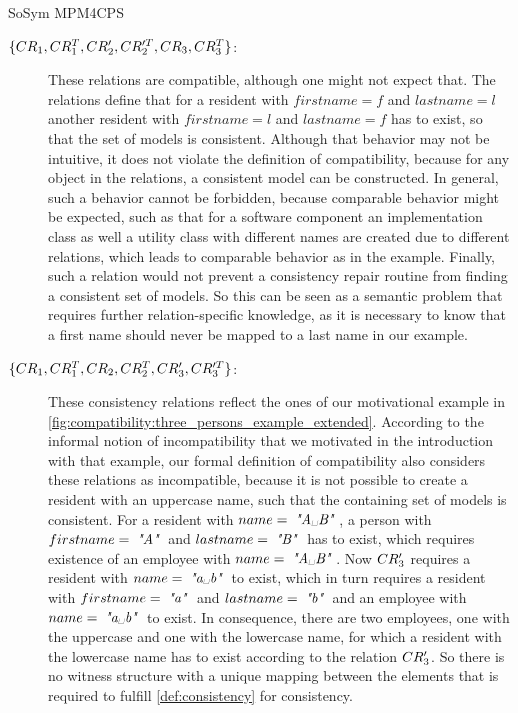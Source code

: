 \begin{copiedFrom}{SoSym MPM4CPS}
\begin{example}
\begin{description}
\item[$\{ CR_{1}, CR^T_{1}, CR'_{2}, CR'^T_{2}, CR_{3}, CR^T_{3} \}$:]
These relations are compatible, although one might not expect that. The relations define that for a resident with $firstname = f$ and $lastname = l$ another resident with $firstname = l$ and $lastname = f$ has to exist, so that the set of models is consistent.
Although that behavior may not be intuitive, it does not violate the definition of compatibility, because for any object in the relations, a consistent model can be constructed.
In general, such a behavior cannot be forbidden, because comparable behavior might be expected, such as that for a software component an implementation class as well a utility class with different names are created due to different relations, which leads to comparable behavior as in the example.
Finally, such a relation would not prevent a consistency repair routine from finding a consistent set of models.
So this can be seen as a semantic problem that requires further relation-specific knowledge, as it is necessary to know that a first name should never be mapped to a last name in our example.

\item[$\{ CR_{1}, CR^T_{1}, CR_{2}, CR^T_{2}, CR'_{3}, CR'^T_{3} \}$:]
These consistency relations reflect the ones of our motivational example in \autoref{fig:compatibility:three_persons_example_extended}.
According to the informal notion of incompatibility that we motivated in the introduction with that example, our formal definition of compatibility also considers these relations as incompatible, because it is not possible to create a resident with an uppercase name, such that the containing set of models is consistent.
For a resident with $name = \mathtext{"A\textvisiblespace B"}$, a person with $firstname = \; \textit{"A"} \;$ and $lastname = \; \textit{"B"} \;$ has to exist, which requires existence of an employee with $name = \mathtext{"A\textvisiblespace B"}$. Now $CR'_{3}$ requires a resident with $name = \mathtext{"a\textvisiblespace b"}$ to exist, which in turn requires a resident with $firstname = \; \textit{"a"} \;$ and $lastname = \; \textit{"b"} \;$ and an employee with $name = \mathtext{"a\textvisiblespace b"}$ to exist.
In consequence, there are two employees, one with the uppercase and one with the lowercase name, for which a resident with the lowercase name has to exist according to the relation $CR'_{3}$. So there is no witness structure with a unique mapping between the elements that is required to fulfill \autoref{def:consistency} for consistency.
\end{description}
\end{example}


\end{copiedFrom}
